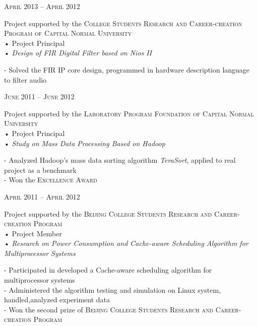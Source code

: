 \documentclass[10pt,a4paper]{article} %
\begin{document}
\begin{minipage}[t]{0.5\textwidth}
{\raggedleft\textsc{April 2013 -- April 2012}\par}

{\raggedright Project supported by the \textsc{College Students Research and Career-creation Program of Capital Normal University}\\
 • Project Principal\\
 • \textit{Design of FIR Digital Filter based on Nios II}\\}

\normalsize{
-  Solved the FIR IP core design, programmed in hardware description language to filter audio
}\\

{\raggedleft\textsc{June 2011 -- June 2012}\par}

{\raggedright Project supported by the \textsc{Laboratory Program Foundation of Capital Normal University}\\
 • Project Principal\\
 • \textit{Study on Mass Data Processing Based on Hadoop}\\}

\normalsize{
-  Analyzed Hadoop's mass data sorting algorithm \textit{TeraSort}, applied to real project as a benchmark\\
-  Won the \textsc{Excellence Award}}\\


{\raggedleft\textsc{April 2011 -- April 2012}\par}

{\raggedright Project supported by the \textsc{Beijing College Students Research and Career-creation Program} \\
 • Project Member\\
 • \textit{Research on Power Consumption and Cache-aware Scheduling Algorithm for Multiprocessor Systems}\\}

\normalsize{
-  Participated in developed  a Cache-aware scheduling algorithm for multiprocessor systems\\
-  Administered the algorithm testing and simulation on Linux system, handled,analyzed experiment data\\
-  Won the second prize of \textsc{Beijing College Students Research and Career-creation Program}
}\\


\end{minipage}
\end{document}
